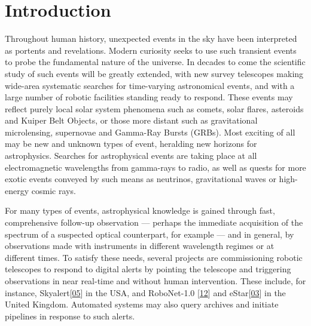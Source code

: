 \documentclass[11pt,a4paper]{ivoa}
\begin{document}
\section{Introduction}

Throughout human history, unexpected events in the sky have been interpreted as portents and revelations. Modern curiosity seeks to use such transient events to probe the fundamental nature of the universe. In decades to come the scientific study of such events will be greatly extended, with new survey telescopes making wide-area systematic searches for time-varying astronomical events, and with a large number of robotic facilities standing ready to respond. These events may reflect purely local solar system phenomena such as comets, solar flares, asteroids and Kuiper Belt Objects, or those more distant such as gravitational microlensing, supernovae and Gamma-Ray Bursts (GRBs). Most exciting of all may be new and unknown types of event, heralding new horizons for astrophysics. Searches for astrophysical events are taking place at all electromagnetic wavelengths from gamma-rays to radio, as well as quests for more exotic events conveyed by such means as neutrinos, gravitational waves or high-energy cosmic rays. 

For many types of events, astrophysical knowledge is gained through fast, comprehensive follow-up observation --- perhaps the immediate acquisition of the spectrum of a suspected optical counterpart, for example --- and in general, by observations made with instruments in different wavelength regimes or at different times. To satisfy these needs, several projects are commissioning robotic telescopes to respond to digital alerts by pointing the telescope and triggering observations in near real-time and without human intervention. These include, for instance, Skyalert[\hyperref[bib05]{05}] in the USA, and RoboNet-1.0 [\hyperref[bib12]{12}] and eStar[\hyperref[bib03]{03}] in the United Kingdom. Automated systems may also query archives and initiate pipelines in response to such alerts. 
\end{document}
